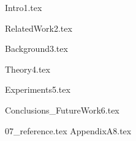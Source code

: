 \documentclass{ctuthesis}
\begin{document}
\maketitle


{Intro1.tex}

{RelatedWork2.tex}

{Background3.tex}

{Theory4.tex}


{Experiments5.tex}


{Conclusions_FutureWork6.tex}



{07_reference.tex}
{AppendixA8.tex}
\end{document}
